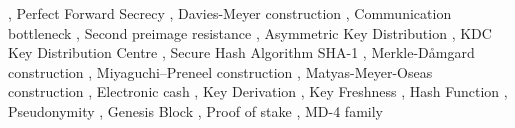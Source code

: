 \documentclass[
  10pt,
  a4paper,
]{article}
\begin{document}
\begin{multicols*}{2}
{\vspace{2mm}\color{NavyBlue!70},\vspace{2mm}} Perfect Forward Secrecy
{\vspace{2mm}\color{NavyBlue!70},\vspace{2mm}} Davies-Meyer construction
{\vspace{2mm}\color{NavyBlue!70},\vspace{2mm}} Communication bottleneck
{\vspace{2mm}\color{NavyBlue!70},\vspace{2mm}} Second preimage
resistance {\vspace{2mm}\color{NavyBlue!70},\vspace{2mm}} Asymmetric Key
Distribution {\vspace{2mm}\color{NavyBlue!70},\vspace{2mm}} KDC Key
Distribution Centre {\vspace{2mm}\color{NavyBlue!70},\vspace{2mm}}
Secure Hash Algorithm SHA-1
{\vspace{2mm}\color{NavyBlue!70},\vspace{2mm}} Merkle-D\aa mgard
construction {\vspace{2mm}\color{NavyBlue!70},\vspace{2mm}}
Miyaguchi--Preneel construction
{\vspace{2mm}\color{NavyBlue!70},\vspace{2mm}} Matyas-Meyer-Oseas
construction {\vspace{2mm}\color{NavyBlue!70},\vspace{2mm}} Electronic
cash {\vspace{2mm}\color{NavyBlue!70},\vspace{2mm}} Key Derivation
{\vspace{2mm}\color{NavyBlue!70},\vspace{2mm}} Key Freshness
{\vspace{2mm}\color{NavyBlue!70},\vspace{2mm}} Hash Function
{\vspace{2mm}\color{NavyBlue!70},\vspace{2mm}} Pseudonymity
{\vspace{2mm}\color{NavyBlue!70},\vspace{2mm}} Genesis Block
{\vspace{2mm}\color{NavyBlue!70},\vspace{2mm}} Proof of stake
{\vspace{2mm}\color{NavyBlue!70},\vspace{2mm}} MD-4 family

\end{multicols*}
\end{document}
